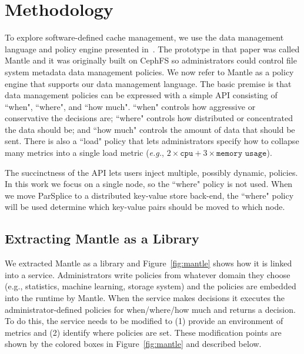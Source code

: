 \section{Methodology}

To explore software-defined cache management, we use the data management
language and policy engine presented in~\cite{sevilla:sc15-mantle}. The
prototype in that paper was called Mantle and it was originally built on CephFS
so administrators could control file system metadata data management policies.
We now refer to Mantle as a policy engine that supports our data management
language.  The basic premise is that data management policies can be expressed
with a simple API consisting of ``when", ``where", and ``how much". ``when"
controls how aggressive or conservative the decisions are; ``where" controls
how distributed or concentrated the data should be; and ``how much" controls
the amount of data that should be sent. There is also a ``load" policy that
lets administrators specify how to collapse many metrics into a single load
metric ({\it e.g.}, \(2\times\texttt{cpu} + 3\times\texttt{memory usage}\)).

The succinctness of the API lets users inject multiple, possibly dynamic, policies. In
this work we focus on a single node, so the ``where" policy is not used. When
we move ParSplice to a distributed key-value store back-end, the ``where" policy
will be used determine which key-value pairs should be moved to which node.

\subsection{Extracting Mantle as a Library}
\label{sec:extracting}


We extracted Mantle as a library and Figure~\ref{fig:mantle} shows how it is
linked into a service.  Administrators write policies from whatever domain they
choose ({e.g.}, statistics, machine learning, storage system) and the policies
are embedded into the runtime by Mantle. When the service makes decisions it
executes the administrator-defined policies for when/where/how much and returns
a decision.  To do this, the service needs to be modified to (1) provide an
environment of metrics and (2) identify where policies are set. These
modification points are shown by the colored boxes in Figure~\ref{fig:mantle}
and described below.

